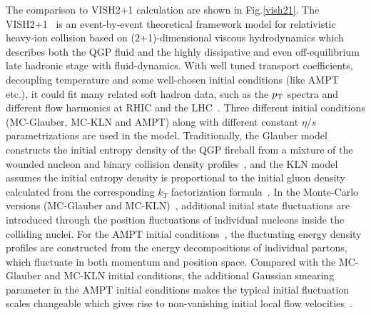   The comparison to VISH2+1 calculation are shown in Fig.\ref{vish21}. The VISH2+1~\cite{Zhu:2016puf} is an event-by-event theoretical framework model for relativistic heavy-ion collision based on (2+1)-dimensional viscous hydrodynamics which describes both the QGP fluid and the highly dissipative and even off-equilibrium late hadronic stage with fluid-dynamics. With well tuned transport coefficients, decoupling temperature  and some well-chosen initial conditions (like {AMPT}~\cite{Xu:2016hmp,Bhalerao:2015iya,Pang:2012he} etc.), it could fit many related soft hadron data, such as the $p_{\rm{T}}$ spectra and different flow harmonics at RHIC and the LHC~\cite{Qiu:2011hf, Shen:2010uy, Shen:2011eg, Bhalerao:2015iya}.
Three different initial conditions ({MC-Glauber}, {MC-KLN} and {AMPT}) along with different constant $\eta/s$ parametrizations are used in the model. 
Traditionally, the Glauber model constructs the initial entropy density of the QGP fireball from a mixture of the wounded nucleon and binary collision density profiles~\cite{Kolb:2000sd}, and the {KLN} model assumes the initial entropy density is proportional to the initial gluon density calculated from the corresponding $k_T$ factorization formula~\cite{Kharzeev:2000ph}. In the Monte-Carlo versions ({MC-Glauber} and {MC-KLN})~\cite{Miller:2007ri,Drescher:2006ca,Hirano:2009ah}, additional initial state fluctuations are introduced through the position fluctuations of individual nucleons inside the colliding nuclei. For the {AMPT} initial conditions~\cite{Bhalerao:2015iya,Pang:2012he,Xu:2016hmp}, the fluctuating energy density profiles are constructed from the energy decompositions of individual partons, which fluctuate in both momentum and position space. Compared with the {MC-Glauber} and {MC-KLN} initial conditions, the additional Gaussian smearing parameter in the {AMPT} initial conditions makes the typical initial fluctuation scales changeable which gives rise to non-vanishing initial local flow velocities~\cite{Pang:2012he}. 


